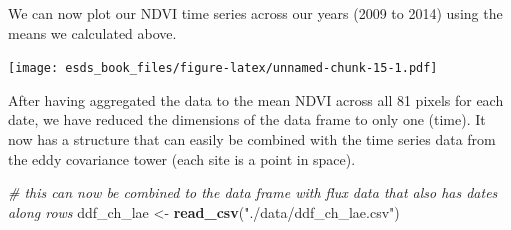 \documentclass[
]{book}
\newenvironment{Shaded}{\begin{snugshade}}{\end{snugshade}}
\newcommand{\CommentTok}[1]{\textcolor[rgb]{0.56,0.35,0.01}{\textit{#1}}}
\newcommand{\DataTypeTok}[1]{\textcolor[rgb]{0.13,0.29,0.53}{#1}}
\newcommand{\DecValTok}[1]{\textcolor[rgb]{0.00,0.00,0.81}{#1}}
\newcommand{\KeywordTok}[1]{\textcolor[rgb]{0.13,0.29,0.53}{\textbf{#1}}}
\newcommand{\NormalTok}[1]{#1}
\newcommand{\OperatorTok}[1]{\textcolor[rgb]{0.81,0.36,0.00}{\textbf{#1}}}
\newcommand{\StringTok}[1]{\textcolor[rgb]{0.31,0.60,0.02}{#1}}
\begin{document}
We can now plot our NDVI time series across our years (2009 to 2014) using the means we calculated above.

\begin{Shaded}
\end{Shaded}

\texttt{[image: esds\_book\_files/figure-latex/unnamed-chunk-15-1.pdf]}

After having aggregated the data to the mean NDVI across all 81 pixels for each date, we have reduced the dimensions of the data frame to only one (time). It now has a structure that can easily be combined with the time series data from the eddy covariance tower (each site is a point in space).

\begin{Shaded}
\begin{Highlighting}[]
\CommentTok{# this can now be combined to the data frame with flux data that also has dates along rows}
\NormalTok{ddf_ch_lae <-}\StringTok{ }\KeywordTok{read_csv}\NormalTok{(}\StringTok{"./data/ddf_ch_lae.csv"}\NormalTok{)}
\end{Highlighting}
\end{Shaded}

\begin{Shaded}
\end{Shaded}
\end{document}
